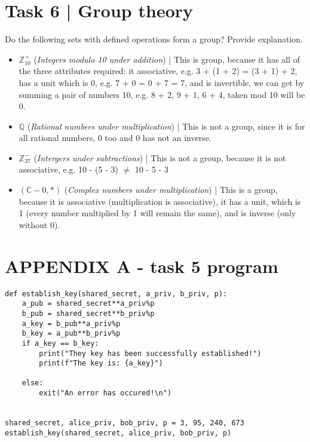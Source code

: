 \documentclass{article}
\begin{document}
\section*{Task 6 | Group theory}
Do the following sets with defined operations form a group? Provide explanation.
\begin{itemize}
    \item $\mathbb{Z}_{10}^+$ (\textit{Integers modulo 10 under addition}) | 
        This is group, because it has all of the three attributes required: it associative, 
        e.g. 3 + (1 + 2) = (3 + 1) + 2, has a unit which is 0, e.g. 7 + 0 = 0 + 7 = 7, and
        is invertible, we can get by summing a pair of numbers 10, e.g. 8 + 2, 9 + 1, 6 + 4,
        taken mod 10 will be 0.
    \item $\mathbb{Q}$ (\textit{Rational numbers under multiplication}) | This is not a group, 
        since it is for all rational numbers, 0 too and 0 has not an inverse.
    \item $\mathbb{Z}_{37}^-$ (\textit{Intergers under subtractions}) | This is not a group, because
        it is not associative, e.g. 10 - (5 - 3) $\ne$ 10 - 5 - 3
    \item $(\mathbb{C} - 0, *)$ (\textit{Complex numbers under multiplication}) | This is a group, 
        because it is associative (multiplication is associative), it has a unit, 
        which is 1 (every number multiplied by 1 will remain the same), and 
        is inverse (only without 0).
\end{itemize}


\section*{APPENDIX A - task 5 program}
\begin{lstlisting}
def establish_key(shared_secret, a_priv, b_priv, p):
    a_pub = shared_secret**a_priv%p
    b_pub = shared_secret**b_priv%p
    a_key = b_pub**a_priv%p
    b_key = a_pub**b_priv%p
    if a_key == b_key:
        print("They key has been successfully established!")
        print(f"The key is: {a_key}")

    else:
        exit("An error has occured!\n")


shared_secret, alice_priv, bob_priv, p = 3, 95, 240, 673
establish_key(shared_secret, alice_priv, bob_priv, p)
\end{lstlisting}
\end{document}
